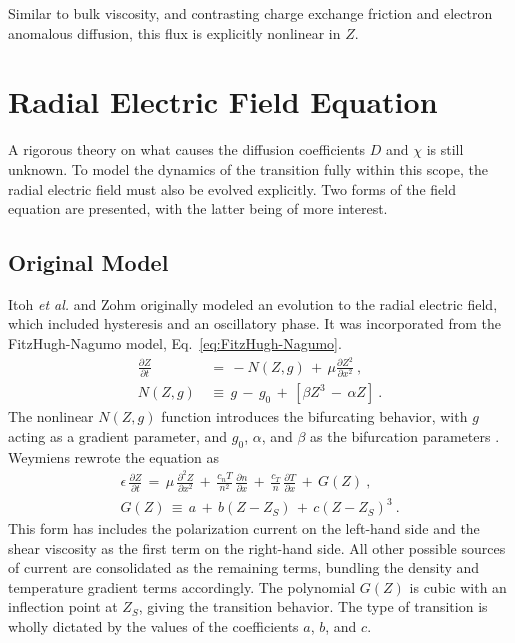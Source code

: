 Similar to bulk viscosity, and contrasting charge exchange friction and electron anomalous diffusion, this flux is explicitly nonlinear in $Z$.


\section{Radial Electric Field Equation}\label{sec:Z_equation}
A rigorous theory on what causes the diffusion coefficients $D$ and $\chi$ is still unknown.
To model the dynamics of the transition fully within this scope, the radial electric field must also be evolved explicitly.
Two forms of the field equation are presented, with the latter being of more interest.

\subsection{Original Model}\label{ssec:original_Z_equation}
Itoh \emph{et al.} \cite{itoh_edge_1991} and Zohm \cite{zohm_dynamic_1994} originally modeled an evolution to the radial electric field, which included hysteresis and an oscillatory phase.
It was incorporated from the FitzHugh-Nagumo model, Eq.~\ref{eq:FitzHugh-Nagumo}.
\begin{align} %
	\frac{\partial Z}{\partial t} \,&=\, -N(Z,g) \,+\, \mu
		\frac{\partial Z^2}{\partial x^2}~,\label{eq:original_z} \\
	N(Z,g) \,&\equiv\, g \,-\, g_0 \,+\, \left[\beta Z^3 \,-\, \alpha Z\right]~.
\end{align}
The nonlinear $N(Z,g)$ function introduces the bifurcating behavior, with $g$ acting as a gradient parameter, and $g_0$, $\alpha$, and $\beta$ as the bifurcation parameters \cite{itoh_model_1988}.
Weymiens \cite{weymiens_bifurcation_2012} rewrote the equation as
\begin{align} %
	\epsilon \, \frac{\partial Z}{\partial t} \,=\, \mu \,
		\frac{\partial^2 Z}{\partial x^2} \,+\, \frac{c_n T}{n^2} \,
		\frac{\partial n}{\partial x} \,+\, \frac{c_T}{n} \,
		\frac{\partial T}{\partial x} \,+\, G(Z)~,\label{eq:original_Z_equation} \\
	G(Z) \,\equiv\, a \,+\, b(Z - Z_S) \,+\, c(Z - Z_S)^3~.
		\label{eq:G_polynomial}
\end{align}
This form has includes the polarization current on the left-hand side and the shear viscosity as the first term on the right-hand side.
All other possible sources of current are consolidated as the remaining terms, bundling the density and temperature gradient terms accordingly.
The polynomial $G(Z)$ is cubic with an inflection point at $Z_S$, giving the transition behavior.
The type of transition is wholly dictated by the values of the coefficients $a$, $b$, and $c$.

